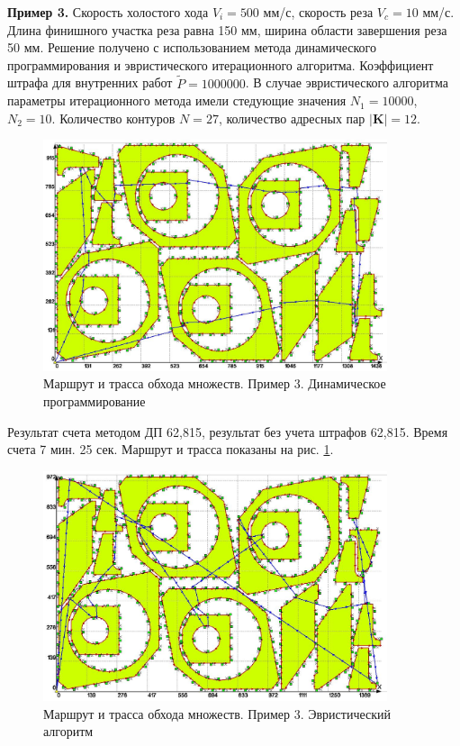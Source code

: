 \documentclass[11pt,twoside,openany]{report}
\begin{document}
{{{\bf Пример 3.} Скорость холостого хода $V_i=500$ мм/с, скорость реза $V_c=10$ мм/с.
Длина финишного участка реза равна 150 мм, ширина области завершения реза 50 мм.
Решение получено с использованием метода динамического программирования
и эвристического итерационного алгоритма. Коэффициент штрафа для внутренних
работ $\tilde{P}=1000000$. В случае эвристического алгоритма параметры итерационного
метода имели стедующие значения $N_1=10000$, $N_2=10$.
Количество контуров $N=27$, количество адресных пар $|\mathbf{K}|=12$.

\begin{figure}
  \begin{center}
  \includegraphics[width=0.9\textwidth]{Sample_27_sets_DP.png}
  \caption{Маршрут и трасса обхода множеств. Пример 3. Динамическое программирование}
  \label{Sample3DP}
  \end{center}
\end{figure}

Результат счета методом ДП 62,815, результат без учета штрафов 62,815.
Время счета 7 мин. 25 сек.
Маршрут и трасса показаны на рис. \ref{Sample3DP}.

\begin{figure}
  \begin{center}
  \includegraphics[width=0.9\textwidth]{Sample_27_sets_approximate.png}
  \caption{Маршрут и трасса обхода множеств. Пример 3. Эвристический алгоритм}
  \label{Sample3Heuristic}
  \end{center}
\end{figure}

}}
\end{document}
